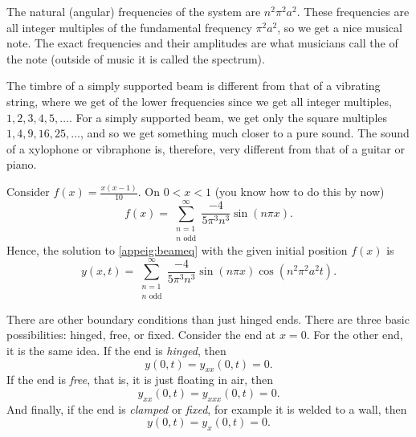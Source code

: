 The natural (angular) frequencies of the system are $n^2 \pi^2 a^2$.
These frequencies are all integer multiples of the fundamental frequency
$\pi^2 a^2$, so we get a nice musical note.  The exact frequencies
and their amplitudes
are what musicians call the \emph{} of the note (outside
of music it is called the spectrum).

The timbre of a simply supported beam
is different from that of a vibrating string, where we get 
of the lower frequencies since we get all integer multiples,
$1,2,3,4,5,\ldots$.  For a simply supported beam, we get
only the square multiples $1,4,9,16,25,\ldots$, and so
we get something much closer to a pure sound.
The sound of a xylophone or vibraphone is, therefore, very different from
that of a guitar or piano.

\begin{example}
Consider $f(x) = \frac{x(x-1)}{10}$.  
On $0 < x < 1$ (you know how to do this by now)
\begin{equation*}
f(x) = \sum_{\substack{n=1\\n \text{~odd}}}^\infty \frac{-4}{5\pi^3 n^3}
\sin (n \pi x) .
\end{equation*}
Hence, the solution to \eqref{appeig:beameq} with the given initial
position $f(x)$ is
\begin{equation*}
y(x,t) = \sum_{\substack{n=1\\n \text{~odd}}}^\infty \frac{-4}{5\pi^3 n^3}
\sin (n \pi x) \cos ( n^2 \pi^2 a^2 t ) .
\end{equation*}
\end{example}

There are other boundary conditions than just hinged ends.  There are
three basic possibilities: hinged, free, or fixed.  Consider
the end at $x=0$.  For the other end, it is the same idea.
If the end is \emph{hinged}, then
\begin{equation*}
y(0,t) = y_{xx}(0,t) = 0 .
\end{equation*}
If the end is \emph{free}, that is, it is just
floating in air, then
\begin{equation*}
y_{xx}(0,t) = y_{xxx}(0,t) = 0 .
\end{equation*}
And finally, if the end is
\emph{clamped}
or  
\emph{fixed}, for example it is welded to a
wall,
then
\begin{equation*}
y(0,t) = y_{x}(0,t) = 0 .
\end{equation*}



